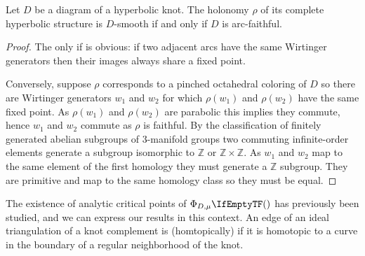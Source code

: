 \documentclass[leqno]{sl2art}
\begin{document}
\begin{bigtheorem}
  \label{thm:arc-faithful}
  Let \(D\) be a diagram of a hyperbolic knot.
  The holonomy \(\rho\) of its complete hyperbolic structure is \(D\)-smooth if and only if \(D\) is arc-faithful.
\end{bigtheorem}
\begin{proof}
  The only if is obvious: if two adjacent arcs have the same Wirtinger generators then their images always share a fixed point.

  Conversely, suppose \(\rho\) corresponds to a pinched octahedral coloring of \(D\) so there are Wirtinger generators \(w_1\) and \(w_2\) for which \(\rho(w_1)\) and \(\rho(w_2)\) have the same fixed point.
  As \(\rho(w_1)\) and \(\rho(w_2)\) are parabolic this implies they commute, hence \(w_1\) and \(w_2\) commute as \(\rho\) is faithful.
  By the classification of finitely generated abelian subgroups of \(3\)-manifold groups \cite[Theorem 9.13]{Hempel1976} two commuting infinite-order elements generate a subgroup isomorphic to \(\mathbb{Z} \) or \(\mathbb{Z} \times \mathbb{Z} \).
  As \(w_1\) and \(w_2\) map to the same element of the first homology they must generate a \(\mathbb{Z}\) subgroup.
  They are primitive and map to the same homology class so they must be equal.
\end{proof}

The existence of analytic critical points of \(\potl[D, \mu]{}\) has previously been studied, and we can express our results in this context.
An edge of an ideal triangulation of a knot complement is (homtopically)  if it is homotopic to a curve in the boundary of a regular neighborhood of the knot.
\end{document}
